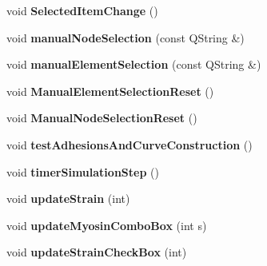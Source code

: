 \begin{DoxyCompactItemize}
\item 
\hypertarget{classMainWindow_ab2c0d4d0d84826cc032a45ea4783dde5}{}void {\bfseries Selected\+Item\+Change} ()\label{classMainWindow_ab2c0d4d0d84826cc032a45ea4783dde5}

\item 
\hypertarget{classMainWindow_a99f4fa67c708306ecac0eb351c6968d6}{}void {\bfseries manual\+Node\+Selection} (const Q\+String \&)\label{classMainWindow_a99f4fa67c708306ecac0eb351c6968d6}

\item 
\hypertarget{classMainWindow_af6253ec8c287b675a80e80bdd0ad31cc}{}void {\bfseries manual\+Element\+Selection} (const Q\+String \&)\label{classMainWindow_af6253ec8c287b675a80e80bdd0ad31cc}

\item 
\hypertarget{classMainWindow_ad613f2de4daee9c84828dc0490b00ffa}{}void {\bfseries Manual\+Element\+Selection\+Reset} ()\label{classMainWindow_ad613f2de4daee9c84828dc0490b00ffa}

\item 
\hypertarget{classMainWindow_a52630b918235794e8ff6cfd6abfc4b7f}{}void {\bfseries Manual\+Node\+Selection\+Reset} ()\label{classMainWindow_a52630b918235794e8ff6cfd6abfc4b7f}

\item 
\hypertarget{classMainWindow_a6e5fe84877b1239bb5a10989bd8247f9}{}void {\bfseries test\+Adhesions\+And\+Curve\+Construction} ()\label{classMainWindow_a6e5fe84877b1239bb5a10989bd8247f9}

\item 
\hypertarget{classMainWindow_a59dd1f2fe0d6900a98feff45c94e23e6}{}void {\bfseries timer\+Simulation\+Step} ()\label{classMainWindow_a59dd1f2fe0d6900a98feff45c94e23e6}

\item 
\hypertarget{classMainWindow_a0dce0c101c73abe3b5f347cd4dacfbd3}{}void {\bfseries update\+Strain} (int)\label{classMainWindow_a0dce0c101c73abe3b5f347cd4dacfbd3}

\item 
\hypertarget{classMainWindow_aae2aa15cd495069aebec712f4064c158}{}void {\bfseries update\+Myosin\+Combo\+Box} (int s)\label{classMainWindow_aae2aa15cd495069aebec712f4064c158}

\item 
\hypertarget{classMainWindow_a99a35d2b2c33a4cadab365403816c15c}{}void {\bfseries update\+Strain\+Check\+Box} (int)\label{classMainWindow_a99a35d2b2c33a4cadab365403816c15c}


\end{DoxyCompactItemize}
